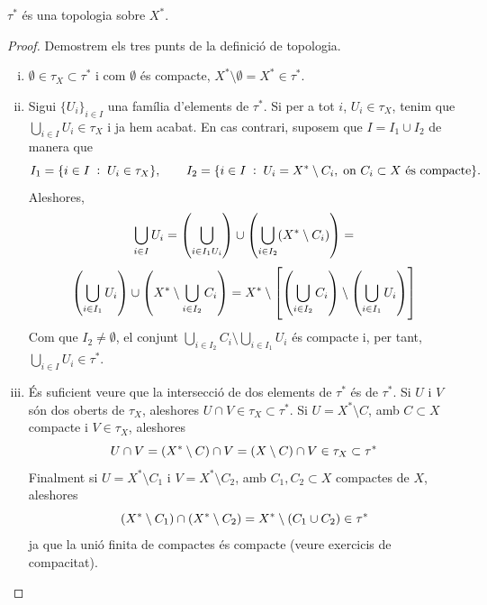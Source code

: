 \documentclass[../main.tex]{subfiles}
\begin{document}
\begin{lema}
\label{lema:topologiacompactificacio} $\tau^*$ és una topologia sobre $X^*$.
\end{lema}
\begin{proof}
Demostrem els tres punts de la definició de topologia.
\begin{enumerate}[(i)]
    \item $\emptyset\in\tau_X\subset\tau^*$ i com $\emptyset$ és compacte, $X^*\setminus \emptyset = X^*\in\tau^*$.
    \item Sigui $\{U_i\}_{i\in I}$ una família d'elements de $\tau^*$. Si per a tot $i$, $U_i\in\tau_X$, tenim que $\bigcup_{i\in I} U_i \in\tau_X$ i ja hem acabat. En cas contrari, suposem que $I = I_1\cup I_2$ de manera que
    \begin{equation}
        \notag
        I_1 = \{i\in I\;:\;U_i\in \tau_X\},\qquad I_2 = \{i\in I\;:\;U_i = X^*\setminus C_i,\;\text{on $C_i\subset X$ és compacte}\}. 
    \end{equation}
    Aleshores,
    \begin{equation}
        \notag
        \bigcup_{i\in I}U_i = \left(\bigcup_{i \in I_1 U_i}\right)\cup\left(\bigcup_{i\in I_2}(X^*\setminus C_i)\right) =
    \end{equation}
    \begin{equation}
        \notag
        \left(\bigcup_{i\in I_1}U_i\right)\cup\left(X^*\setminus \bigcup_{i\in I_2}C_i\right) = X^*\setminus\left[\left(\bigcup_{i\in I_2}C_i\right)\setminus\left(\bigcup_{i\in I_1}U_i\right)\right]
    \end{equation}
    Com que $I_2\not=\emptyset$, el conjunt $\bigcup_{i\in I_2}C_i\setminus \bigcup_{i\in I_1}U_i$ és compacte i, per tant, $\bigcup_{i\in I}U_i\in \tau^*$.
    \item És suficient veure que la intersecció de dos elements de $\tau^*$ és de $\tau^*$. Si $U$ i $V$ són dos oberts de $\tau_X$, aleshores $U\cap V\in\tau_X\subset \tau^*$. Si $U = X^*\setminus C$, amb $C\subset X$ compacte i $V\in\tau_X$, aleshores 
    \begin{equation}
        \notag
        U\cap V = (X^*\setminus C)\cap V = (X\setminus C)\cap V \in\tau_X\subset \tau^*
    \end{equation}
    Finalment si $U = X^*\setminus C_1$ i $V = X^*\setminus C_2$, amb $C_1,C_2\subset X$ compactes de $X$, aleshores 
    \begin{equation}
        \notag
        (X^*\setminus C_1)\cap(X^*\setminus C_2) = X^*\setminus(C_1\cup C_2)\in\tau^*
    \end{equation}
    ja que la unió finita de compactes és compacte (veure exercicis de compacitat).
\end{enumerate}
\end{proof}
\end{document}
